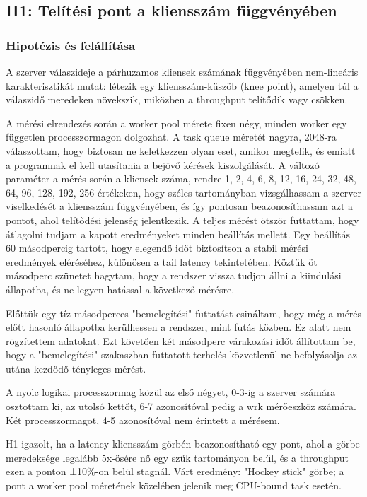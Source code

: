 \documentclass[11pt,a4paper]{article}
\begin{document}
\subsection{H1: Telítési pont a kliensszám függvényében}
\label{ssec:h1}

\subsubsection{Hipotézis és felállítása}
\label{sssec:h1-hipotezis}


A szerver válaszideje a párhuzamos kliensek számának függvényében nem-lineáris 
karakterisztikát mutat: létezik egy kliensszám-küszöb (knee point), amelyen túl a 
válaszidő meredeken növekszik, miközben a throughput telítődik vagy csökken.

A mérési elrendezés során a worker pool mérete fixen négy, minden worker egy
független processzormagon dolgozhat. A task queue méretét nagyra, 2048-ra válaszottam, hogy
biztosan ne keletkezzen olyan eset, amikor megtelik, és emiatt a programnak el kell utasítania
a bejövő kérések kiszolgálását. A változó paraméter a mérés során a kliensek száma, 
rendre 1, 2, 4, 6, 8, 12, 16, 24, 32, 48, 64, 96, 128, 192, 256 értékeken, hogy
széles tartományban vizsgálhassam a szerver viselkedését a kliensszám függvényében, és így pontosan beazonosíthassam azt a pontot,
ahol telítődési jelenség jelentkezik.
A teljes mérést ötször futtattam, hogy átlagolni tudjam a kapott eredményeket minden beállítás mellett.
Egy beállítás 60 másodpercig tartott, hogy elegendő időt biztosítson a stabil mérési eredmények eléréséhez, különösen a tail latency tekintetében.
Köztük öt másodperc szünetet hagytam, hogy a rendszer vissza tudjon állni a kiindulási állapotba, és ne legyen hatással a következő mérésre.

Előttük egy tíz másodperces "bemelegítési" futtatást csináltam, hogy még a mérés előtt hasonló állapotba kerülhessen a rendszer,
mint futás közben. Ez alatt nem rögzítettem adatokat.
Ezt követően két másodperc várakozási időt állítottam be, hogy a "bemelegítési" szakaszban futtatott terhelés közvetlenül ne befolyásolja
az utána kezdődő tényleges mérést.

A nyolc logikai processzormag közül az első négyet, 0-3-ig a szerver számára osztottam ki, az utolsó kettőt, 6-7 azonosítóval 
pedig a wrk mérőeszköz számára. Két processzormagot, 4-5 azonosítóval nem érintett a mérésem.



 H1 igazolt, ha a latency-kliensszám görbén beazonosítható egy pont, ahol 
 a görbe meredeksége legalább 5x-ösére nő egy szűk tartományon belül, és a throughput 
 ezen a ponton ±10\%-on belül stagnál.
Várt eredmény: "Hockey stick" görbe; a pont a worker pool méretének közelében 
jelenik meg CPU-bound task esetén.
\end{document}
